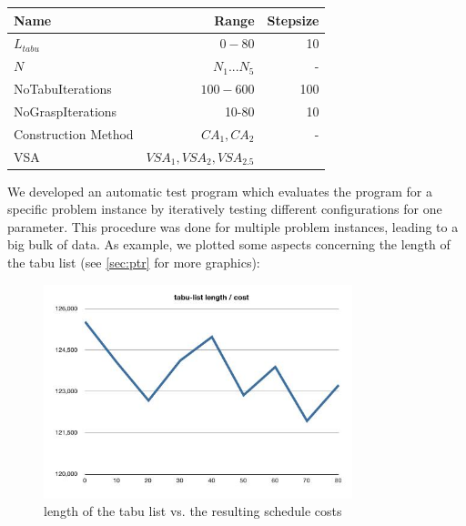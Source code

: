 \documentclass[a4paper,11pt]{article}
\begin{document}
\begin{center}
\begin{tabular}{| l | r |r | }
  \hline                       
  Name & Range & Stepsize \\   \hline     \hline    
  $L_{tabu}$ &  $0-80$& 10\\ \hline    
  $N$ &  $N_1 ... N_5$ & -\\ \hline   
  NoTabuIterations & $100-600$  & 100 \\ \hline  
  NoGraspIterations &  10-80 & 10  \\ \hline 
  Construction Method &  $CA_1, CA_2 $& - \\ \hline 
  VSA & $ VSA_1, VSA_2, VSA_{2.5}$  & \\ \hline 
\end{tabular}
\end{center}

We developed an automatic test program which evaluates the program for a specific problem instance 
by iteratively testing different configurations for one parameter. This procedure was done for multiple problem instances, leading to a big bulk of data.
As example, we plotted some aspects concerning the length of the tabu list (see \ref{sec:ptr} for more graphics):

\begin{figure}[htb]
  \begin{center}
    \includegraphics[width=0.8\textwidth]{images/tabulist-len-cost}
  \end{center}
  \caption{length of the tabu list vs. the resulting schedule costs}
  \label{fig:tabu_len_cost}
\end{figure}
\end{document}
